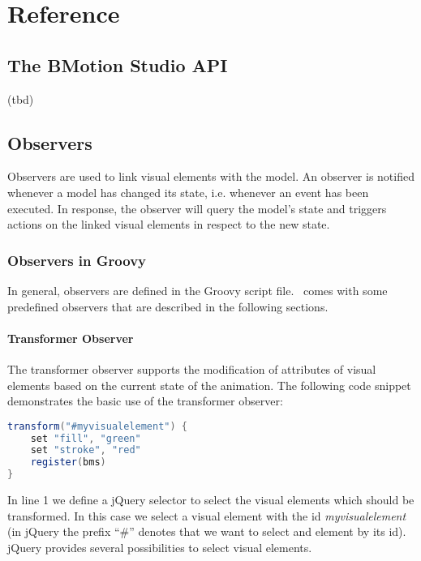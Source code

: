 \chapter{Reference}
\label{reference}

\section{The BMotion Studio API}
\label{sec:bmsapi}

(tbd)

\section{Observers}
\label{sec:observers}

Observers are used to link visual elements with the model. 
An observer is notified whenever a model has changed its state, i.e. whenever an event has been executed. 
In response, the observer will query the model's state and triggers actions on the linked visual elements in respect to the new state. 

\subsection{Observers in Groovy}
\label{sec:groovy_observers}

In general, observers are defined in the Groovy script file.
\bms~comes with some predefined observers that are described in the following sections.

\subsubsection{Transformer Observer}
\label{sec:transformer_observer}

The transformer observer supports the modification of attributes of visual elements based on the current state of the animation.
The following code snippet demonstrates the basic use of the transformer observer:

\begin{lstlisting}[float=ht,language=Groovy]
transform("#myvisualelement") {
    set "fill", "green"
    set "stroke", "red"
    register(bms)
}
\end{lstlisting}

In line 1 we define a jQuery selector to select the visual elements which should be transformed.
In this case we select a visual element with the id \textit{myvisualelement} (in jQuery the prefix ``\#'' denotes that we want to select and element by its id).
jQuery provides several possibilities to select visual elements.

